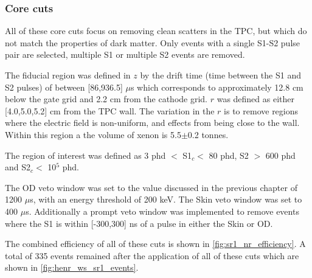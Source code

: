 \subsubsection{Core cuts}
All of these core cuts focus on removing clean scatters in the TPC, but which do not match the properties of dark matter.
Only events with a single S1-S2 pulse pair are selected, multiple S1 or multiple S2 events are removed.
\par
The fiducial region was defined in $z$ by the drift time (time between the S1 and S2 pulses) of between [86,936.5] $\mu$s which corresponds to approximately 12.8 cm below the gate grid and 2.2 cm from the cathode grid.
$r$ was defined as either [4.0,5.0,5.2] cm from the TPC wall. The variation in the $r$ is to remove regions where the electric field is non-uniform, and effects from being close to the wall.
Within this region a the volume of xenon is 5.5$\pm$0.2 tonnes.
\par
The region of interest was defined as 3 phd $<$ S1$_c <$ 80 phd, S2 $>$ 600 phd and S2$_c <$ 10$^5$ phd.
\par
The OD veto window was set to the value discussed in the previous chapter of 1200 $\mu$s, with an energy threshold of 200 keV.
The Skin veto window was set to 400 $\mu$s.
Additionally a prompt veto window was implemented to remove events where the S1 is within [-300,300] ns of a pulse in either the Skin or OD.

\par
The combined efficiency of all of these cuts is shown in \autoref{fig:sr1_nr_efficiency}.
A total of 335 events remained after the application of all of these cuts which are shown in \autoref{fig:henr_ws_sr1_events}.


